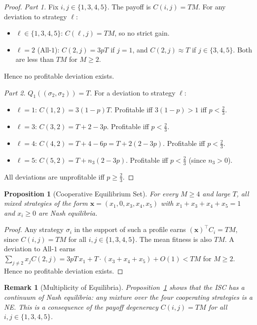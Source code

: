 \documentclass[12pt,a4paper]{article}
\newtheorem{proposition}{Proposition}[section]
\newtheorem{remark}{Remark}[section]
\begin{document}
\begin{proof}
\textit{Part 1.}  Fix $i,j\in\{1,3,4,5\}$.  The payoff is $C(i,j)=TM$.  For
any deviation to strategy $\ell$:
\begin{itemize}
  \item $\ell\in\{1,3,4,5\}$: $C(\ell,j)=TM$, so no strict gain.
  \item $\ell=2$ (All-$1$): $C(2,j)=3pT$ if $j=1$, and $C(2,j)\approx T$ if
        $j\in\{3,4,5\}$.  Both are less than $TM$ for $M\geq 2$.
\end{itemize}
Hence no profitable deviation exists.

\textit{Part 2.}  $Q_1((\sigma_2,\sigma_2))=T$.  For a deviation to
strategy $\ell$:
\begin{itemize}
  \item $\ell=1$: $C(1,2)=3(1-p)T$. Profitable iff $3(1-p)>1$ iff $p<\tfrac{2}{3}$.
  \item $\ell=3$: $C(3,2)=T+2-3p$.  Profitable iff $p<\tfrac{2}{3}$.
  \item $\ell=4$: $C(4,2)=T+4-6p=T+2(2-3p)$.  Profitable iff $p<\tfrac{2}{3}$.
  \item $\ell=5$: $C(5,2)=T+n_3(2-3p)$.  Profitable iff $p<\tfrac{2}{3}$
        (since $n_3>0$).
\end{itemize}
All deviations are unprofitable iff $p\geq\tfrac{2}{3}$.
\end{proof}

\begin{proposition}[Cooperative Equilibrium Set]\label{prop:coopset}
For every $M\geq 4$ and large $T$, all mixed strategies of the form
$\mathbf{x}=(x_1,0,x_3,x_4,x_5)$ with $x_1+x_3+x_4+x_5=1$ and $x_i\geq 0$
are Nash equilibria.
\end{proposition}

\begin{proof}
Any strategy $\sigma_i$ in the support of such a profile earns
$(\mathbf{x})^\top C_i = TM$, since $C(i,j)=TM$ for all $i,j\in\{1,3,4,5\}$.
The mean fitness is also $TM$.  A deviation to All-$1$ earns
$\sum_{j\neq 2} x_j C(2,j) = 3pT\,x_1 + T\cdot(x_3+x_4+x_5) + O(1)
< TM$
for $M\geq 2$.  Hence no profitable deviation exists.
\end{proof}

\begin{remark}[Multiplicity of Equilibria]
Proposition~\ref{prop:coopset} shows that the ISC has a \emph{continuum} of
Nash equilibria: any mixture over the four cooperating strategies is a NE.
This is a consequence of the payoff degeneracy $C(i,j)=TM$ for all
$i,j\in\{1,3,4,5\}$.
\end{remark}
\end{document}
